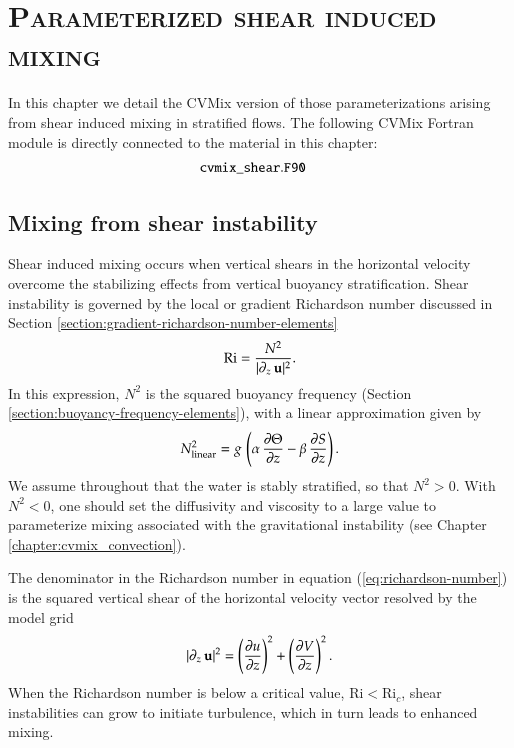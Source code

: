 \chapter{\scshape Parameterized shear induced mixing}
\label{chapter:cvmix_shear}

\minitoc
\vspace{.5cm}

\begin{mdframed}[backgroundcolor=lightgray!50]
  In this chapter we detail the CVMix version of those
  parameterizations arising from shear induced mixing in stratified
  flows.  The following CVMix Fortran module is directly connected to
  the material in this chapter:
\begin{align*} 
 &{\tt cvmix\_shear.F90}
\end{align*}
\end{mdframed}

\section{Mixing from shear instability}
\label{section:shear-instability-mixing}

Shear induced mixing occurs when vertical shears in the horizontal
velocity overcome the stabilizing effects from vertical buoyancy
stratification.  Shear instability is governed by the local or
gradient Richardson number discussed in Section
\ref{section:gradient-richardson-number-elements}
\begin{equation}
 \mbox{Ri} = \frac{N^{2}}{|\partial_{z} \, {\bf u}|^{2} }.
\label{eq:richardson-number}
\end{equation}
In this expression, $N^{2}$ is the squared buoyancy frequency (Section
\ref{section:buoyancy-frequency-elements}), with a linear
approximation given by
\begin{equation}
 N^{2}_{\mbox{\scriptsize linear}} 
 = g \, \left( \alpha \, \frac{\partial \Theta}{\partial z} 
                         - \beta  \, \frac{\partial S}{\partial z} \right).
\label{eq:buoyancy-frequency-shear}
\end{equation}
We assume throughout that the water is stably stratified, so that
$N^{2} > 0$.  With $N^{2} < 0$, one should set the diffusivity and
viscosity to a large value to parameterize mixing associated with the
gravitational instability (see Chapter
\ref{chapter:cvmix_convection}).

The denominator in the Richardson number in equation
(\ref{eq:richardson-number}) is the squared vertical shear of the
horizontal velocity vector resolved by the model grid
\begin{equation}
 |\partial_{z} \, {\bf u}|^{2}  =
  \left( \frac{\partial u}{\partial z} \right)^{2} 
 +
 \left( \frac{\partial V}{\partial z} \right)^{2}. 
\end{equation}
When the Richardson number is below a critical value, $\mbox{Ri} <
\mbox{Ri}_{c}$, shear instabilities can grow to initiate turbulence,
which in turn leads to enhanced mixing.

